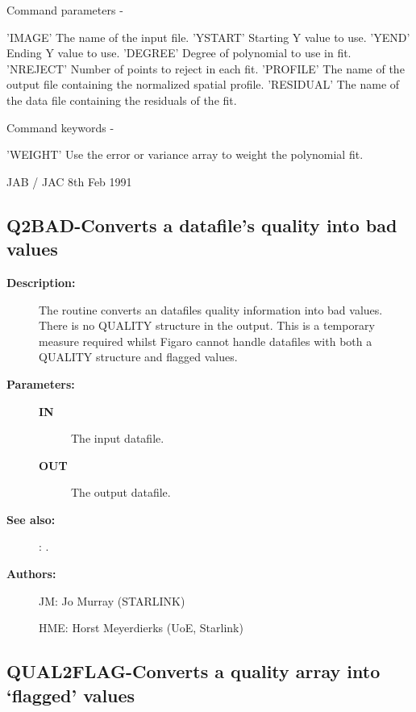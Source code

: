 \begin{description}
\begin{description}
\begin{terminalv}
 Command parameters -

 'IMAGE'     The name of the input file.
 'YSTART'    Starting Y value to use.
 'YEND'      Ending Y value to use.
 'DEGREE'    Degree of polynomial to use in fit.
 'NREJECT'   Number of points to reject in each fit.
 'PROFILE'   The name of the output file containing the normalized
                spatial profile.
 'RESIDUAL'  The name of the data file containing the residuals of
                the fit.

 Command keywords -

 'WEIGHT'    Use the error or variance array to weight the
             polynomial fit.


                                 JAB / JAC 8th Feb 1991
\end{terminalv}
\end{description}
\subsection{Q2BAD-\label{Q2BAD}Converts a datafile's quality into bad values}
\begin{description}

\item [\textbf{Description:}]
 The routine converts an datafiles quality information into bad values.
 There is no QUALITY structure in the output.
 This is a temporary measure required whilst Figaro cannot handle
 datafiles with both a QUALITY structure and flagged values.

\item [\textbf{Parameters:}]
\begin{description}
\item [\textbf{IN}]
 The input datafile.
\item [\textbf{OUT}]
 The output datafile.
\end{description}

\item [\textbf{See also:}]
: .\\

\item [\textbf{Authors:}]
 JM: Jo Murray (STARLINK)

 HME: Horst Meyerdierks (UoE, Starlink)
\end{description}
\subsection{QUAL2FLAG-\label{QUAL2FLAG}Converts a quality array into `flagged' values}
\begin{description}


\end{description}
\end{description}
